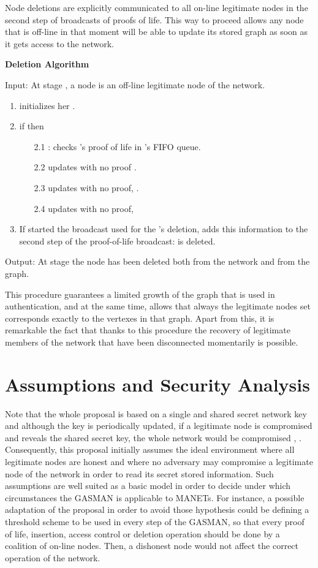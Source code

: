 \documentclass{article}
\begin{document}
Node deletions are explicitly communicated to all on-line
legitimate nodes in the second step of broadcasts of proofs of
life. This way to proceed allows any node that is off-line in that moment will
be able to update its stored graph as soon as it gets access to
the network.

{\bf Deletion Algorithm}


Input: At stage , a node  is an off-line legitimate node of the network.
\begin{enumerate}
    \item   initializes her .
    \item  if  then
    \begin{itemize}
    	\item [2.1]   :  checks 's proof of life in 's FIFO queue.
    	\item [2.2]  updates  with no proof .
    	\item [2.3]  updates 
    		with no proof, .
    	\item [2.4] updates 
        with no proof, 
    \end{itemize}
    \item  If  started the broadcast used for the 's deletion,  adds this information
    to the second step of the proof-of-life broadcast:    is deleted.
\end{enumerate}

Output:  At stage  the node  has been deleted both from the network and from the graph.

This procedure guarantees a limited growth of the graph that
is used in authentication, and at the same time, allows that
always the legitimate nodes set corresponds exactly to the
vertexes in that graph. Apart from this, it is remarkable the fact
that thanks to this procedure  the recovery of legitimate members
of the network that have been disconnected momentarily is possible.

\section{Assumptions and Security Analysis}
\label{AssumptionsasnSecurity}
Note that the whole proposal is based on a single and shared secret network key and although the key is periodically updated, if a legitimate node is compromised and reveals the shared secret key, the whole network would be compromised \cite{HHFSL04}, \cite{Gene07}. Consequently, this proposal initially assumes the ideal environment where all
legitimate nodes are honest and where no adversary may compromise
a legitimate node of the network in order to read its secret
stored information. Such assumptions are well suited as a basic
model in order to decide under which circumstances the GASMAN is applicable to MANETs. For instance, a possible adaptation of the proposal in order to avoid those
hypothesis could be defining a threshold scheme to be used in every step of the GASMAN, so that every proof of life, insertion, access control or deletion operation should be done by a coalition of on-line nodes. Then, a dishonest node would not affect
the correct operation of the network.
\end{document}
